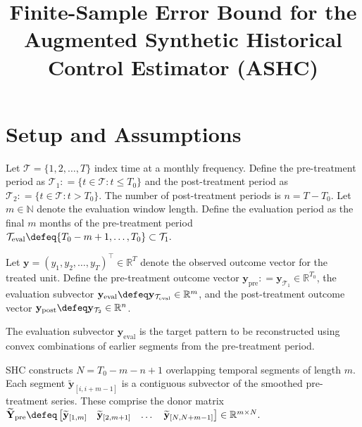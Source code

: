 \documentclass{article}
\title{Finite-Sample Error Bound for the Augmented Synthetic Historical Control Estimator (ASHC)}
\author{}
\date{}
\begin{document}
\maketitle

\section*{Setup and Assumptions}

Let $\mathcal{T} = \{1, 2, \dots, T\}$ index time at a monthly frequency. Define the pre-treatment period as $\mathcal{T}_1 \mathrel{\mathop:}= \{t \in \mathcal{T} : t \leq T_0\}$ and the post-treatment period as $\mathcal{T}_2 \mathrel{\mathop:}= \{t \in \mathcal{T} : t > T_0\}$. The number of post-treatment periods is $n = T - T_0$. Let $m \in \mathbb{N}$ denote the evaluation window length. Define the evaluation period as the final $m$ months of the pre-treatment period $\mathcal{T}_{\text{eval}} \defeq \{T_0 - m + 1, \dots, T_0\} \subset \mathcal{T}_1.$

Let $\mathbf{y} = (y_1, y_2, \dots, y_T)^\top \in \mathbb{R}^T$ denote the observed outcome vector for the treated unit. Define the pre-treatment outcome vector $\mathbf{y}_{\text{pre}} \mathrel{\mathop:}= \mathbf{y}_{\mathcal{T}_1} \in \mathbb{R}^{T_0}$, the evaluation subvector $\mathbf{y}_{\text{eval}} \defeq \mathbf{y}_{\mathcal{T}_{\text{eval}}} \in \mathbb{R}^m$, and the post-treatment outcome vector $\mathbf{y}_{\text{post}} \defeq \mathbf{y}_{\mathcal{T}_2} \in \mathbb{R}^n$. 

The evaluation subvector $\mathbf{y}_{\text{eval}}$ is the target pattern to be reconstructed using convex combinations of earlier segments from the pre-treatment period. 

SHC constructs $N = T_0 - m - n + 1$ overlapping temporal segments of length $m$. Each segment $\widetilde{\mathbf{y}}_{[i, i+m-1]}$ is a contiguous subvector of the smoothed pre-treatment series. These comprise the donor matrix $\widetilde{\mathbf{Y}}_{\text{pre}} \defeq \begin{bmatrix} \widetilde{\mathbf{y}}_{[1, m]} & \widetilde{\mathbf{y}}_{[2, m+1]} & \dots & \widetilde{\mathbf{y}}_{[N, N+m-1]} \end{bmatrix} \in \mathbb{R}^{m \times N}.$
\end{document}
